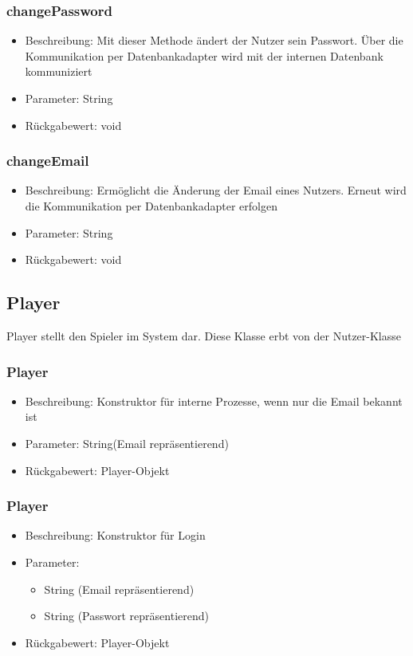 \documentclass[a4paper]{scrreprt}
\begin{document}
		\subsubsection{changePassword}
		\begin{itemize}
			\item Beschreibung: Mit dieser Methode ändert der Nutzer sein Passwort. Über die Kommunikation per Datenbankadapter wird mit der internen Datenbank kommuniziert
			\item Parameter: String
			\item Rückgabewert: void
		\end{itemize}
		\subsubsection{changeEmail}
		\begin{itemize}
			\item Beschreibung: Ermöglicht die Änderung der Email eines Nutzers. Erneut wird die Kommunikation per Datenbankadapter erfolgen
			\item Parameter: String
			\item Rückgabewert: void
		\end{itemize}

	\subsection{Player}
	Player stellt den Spieler im System dar. Diese Klasse erbt von der Nutzer-Klasse
		\subsubsection{Player}
		\begin{itemize}
			\item Beschreibung: Konstruktor für interne Prozesse, wenn nur die Email bekannt ist
			\item Parameter: String(Email repräsentierend)
			\item Rückgabewert: Player-Objekt
		\end{itemize}
		\subsubsection{Player}
		\begin{itemize}
			\item Beschreibung: Konstruktor für Login
			\item Parameter:
				\begin{itemize}
					\item String (Email repräsentierend)
					\item String (Passwort repräsentierend)
				\end{itemize}
			\item Rückgabewert: Player-Objekt
		\end{itemize}
\end{document}
